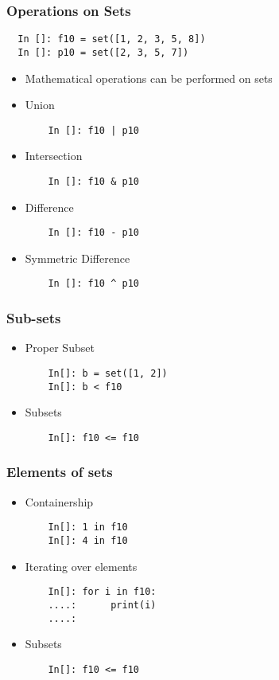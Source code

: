 \documentclass[14pt,compress]{beamer}
\begin{document}
\begin{frame}
  \frametitle{Operations on Sets}
  \begin{lstlisting}
  In []: f10 = set([1, 2, 3, 5, 8])
  In []: p10 = set([2, 3, 5, 7])
  \end{lstlisting}
  \begin{itemize}
  \item Mathematical operations can be performed on sets
  \end{itemize}
  \begin{itemize}
  \item Union
    \begin{lstlisting}
    In []: f10 | p10
    \end{lstlisting}
  \item Intersection
    \begin{lstlisting}
    In []: f10 & p10
    \end{lstlisting}
  \item Difference
    \begin{lstlisting}
    In []: f10 - p10
    \end{lstlisting}
  \item Symmetric Difference
\begin{lstlisting}
    In []: f10 ^ p10
    \end{lstlisting}
  \end{itemize}
\end{frame}

\begin{frame}[fragile]
  \frametitle{Sub-sets}
  \begin{itemize}
  \item Proper Subset
    \begin{lstlisting}
    In[]: b = set([1, 2])
    In[]: b < f10
    \end{lstlisting}
  \item Subsets
    \begin{lstlisting}
    In[]: f10 <= f10
    \end{lstlisting}
  \end{itemize}
\end{frame}

\begin{frame}[fragile]
  \frametitle{Elements of sets}
  \begin{itemize}
  \item Containership
    \begin{lstlisting}
    In[]: 1 in f10
    In[]: 4 in f10
    \end{lstlisting}
  \item Iterating over elements
    \begin{lstlisting}
    In[]: for i in f10:
    ....:      print(i)
    ....:
    \end{lstlisting}
  \item Subsets
    \begin{lstlisting}
    In[]: f10 <= f10
    \end{lstlisting}
  \end{itemize}
\end{frame}
\end{document}
